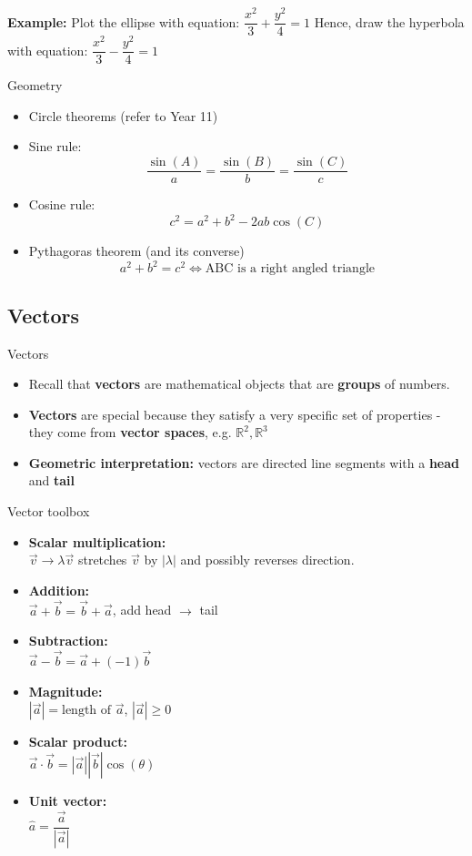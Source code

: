 \documentclass{beamer}
\begin{document}
\begin{frame}
	\textbf{Example:} Plot the ellipse with equation:
	$\dfrac{x^2}{3} + \dfrac{y^2}{4} = 1$
	Hence, draw the hyperbola with equation:
	$\dfrac{x^2}{3} - \dfrac{y^2}{4} = 1$
	\vspace{5cm}
\end{frame}

\begin{frame}{Geometry}
	\begin{itemize}
		\item Circle theorems (refer to Year 11)
		\item Sine rule:
			$$\dfrac{\sin(A)}{a} = \dfrac{\sin(B)}{b} = \dfrac{\sin(C)}{c}$$
		\item Cosine rule:
			$$c^2 = a^2 + b^2 - 2ab\cos(C)$$
		\item Pythagoras theorem (and its converse)
			$$a^2 + b^2 = c^2 \Leftrightarrow \text{ABC is a right angled triangle}$$
	\end{itemize}
\end{frame}

\subsection{Vectors}
\begin{frame}{Vectors}
\begin{itemize}
	\item Recall that \textbf{vectors} are mathematical objects that are \textbf{groups} of numbers.
	\item \textbf{Vectors} are special because they satisfy a very specific set of properties - they come from \textbf{vector spaces}, e.g. $\mathbb{R}^2, \mathbb{R}^3$
	\item \textbf{Geometric interpretation:} vectors are directed line segments with a \textbf{head} and \textbf{tail}
\end{itemize}
\end{frame}

\begin{frame}{Vector toolbox}
	\begin{itemize}
		\item \textbf{Scalar multiplication: }\\$\vec{v} \to \lambda \vec{v}$ stretches $\vec{v}$ by $|\lambda|$ and possibly reverses direction.
		\item \textbf{Addition: }\\$\vec{a} + \vec{b} = \vec{b} + \vec{a}$, add head $\to$ tail
		\item \textbf{Subtraction: }\\ $\vec{a} - \vec{b} = \vec{a} + (-1)\vec{b}$
		\item \textbf{Magnitude: }\\$|\vec{a}| = \text{length of }\vec{a}$, $|\vec{a}| \ge 0$
		\item \textbf{Scalar product: }\\ $\vec{a}\cdot\vec{b} = |\vec{a}||\vec{b}|\cos(\theta)$
		\item \textbf{Unit vector: }\\ $\hat{a} = \dfrac{\vec{a}}{|\vec{a}|}$
	\end{itemize}
\end{frame}
\end{document}
